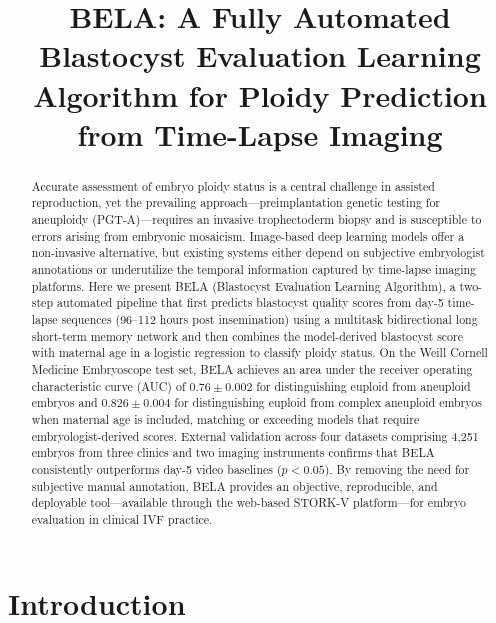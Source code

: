 \documentclass[11pt]{article}
\title{BELA: A Fully Automated Blastocyst Evaluation Learning Algorithm for Ploidy Prediction from Time-Lapse Imaging}
\date{}
\begin{document}
\maketitle

\begin{abstract}
Accurate assessment of embryo ploidy status is a central challenge in assisted reproduction, yet the prevailing approach---preimplantation genetic testing for aneuploidy (PGT-A)---requires an invasive trophectoderm biopsy and is susceptible to errors arising from embryonic mosaicism. Image-based deep learning models offer a non-invasive alternative, but existing systems either depend on subjective embryologist annotations or underutilize the temporal information captured by time-lapse imaging platforms. Here we present BELA (Blastocyst Evaluation Learning Algorithm), a two-step automated pipeline that first predicts blastocyst quality scores from day-5 time-lapse sequences (96--112 hours post insemination) using a multitask bidirectional long short-term memory network and then combines the model-derived blastocyst score with maternal age in a logistic regression to classify ploidy status. On the Weill Cornell Medicine Embryoscope test set, BELA achieves an area under the receiver operating characteristic curve (AUC) of $0.76 \pm 0.002$ for distinguishing euploid from aneuploid embryos and $0.826 \pm 0.004$ for distinguishing euploid from complex aneuploid embryos when maternal age is included, matching or exceeding models that require embryologist-derived scores. External validation across four datasets comprising 4{,}251 embryos from three clinics and two imaging instruments confirms that BELA consistently outperforms day-5 video baselines ($p < 0.05$). By removing the need for subjective manual annotation, BELA provides an objective, reproducible, and deployable tool---available through the web-based STORK-V platform---for embryo evaluation in clinical IVF practice.
\end{abstract}

\section{Introduction}
\end{document}
